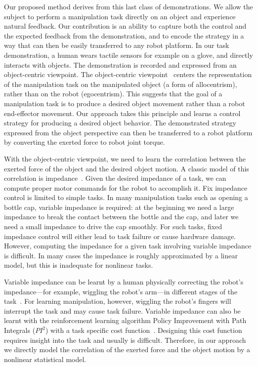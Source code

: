 Our proposed method derives from this last class of demonstrations.
We allow the subject to perform a manipulation task directly on an
object and experience natural feedback.  Our contribution is an
ability to capture both the control and the expected feedback from the
demonstration, and to encode the strategy in a way that can then be
easily transferred to any robot platform. In our task demonstration, a
human wears tactile sensors for example on a glove, and directly
interacts with objects. The demonstration is recorded and expressed
from an object-centric viewpoint. The object-centric
viewpoint~\citep{okamura2000overview,jain2013improving,Miao2014}
centers the representation of the manipulation task on the manipulated
object (a form of allocentrism), rather than on the robot (egocentrism). This
suggests that the goal of a manipulation task is to produce a desired
object movement rather than a robot end-effector movement. Our
approach takes this principle and learns a control strategy for
producing a desired object behavior.  The demonstrated strategy
expressed from the object perspective can then be transferred to a
robot platform by converting %
the exerted force to robot joint torque.

With the object-centric viewpoint, we need to learn the correlation
between the exerted force of the object and the desired object
motion. A classic model of this correlation is
impedance~\citep{howard2010transferring,wimbock2012comparison}. Given
the desired impedance of a task, we can compute proper motor commands
for the robot to accomplish it. Fix impedance control is limited to
simple tasks. In many manipulation tasks such as opening a bottle cap,
variable impedance is required: at the beginning we need a large
impedance to break the contact between the bottle and the cap, and
later we need a small impedance to drive the cap smoothly. For such
tasks, fixed impedance control will either lead to task failure or cause
hardware damage.  However, computing the impedance for a given task
involving variable impedance is difficult.  In many cases the
impedance is roughly approximated by a linear model, but this is
inadequate for nonlinear tasks. %


Variable impedance can be learnt by a human physically correcting the
robot's impedance---for example, wiggling the robot's arm---in different stages of
the task~\citep{kronander2012online}. For learning manipulation,
however, wiggling the robot's fingers will interrupt the task and may
cause task failure.
Variable impedance can also be learnt with the reinforcement learning
algorithm Policy Improvement with Path Integrals ($PI^2$) with a task
specific cost function~\citep{buchli2011learning}. Designing this cost
function requires insight into the task and usually is
difficult. Therefore, in our approach we directly model the
correlation of the exerted force and the object motion by a nonlinear
statistical model.


